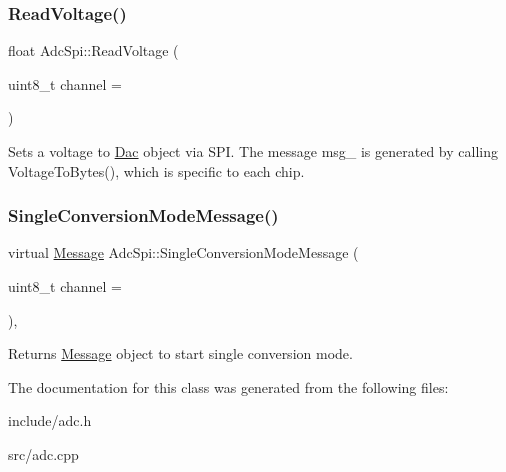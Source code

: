 \subsubsection{\texorpdfstring{Read\+Voltage()}{ReadVoltage()}}
{\footnotesize\ttfamily float Adc\+Spi\+::\+Read\+Voltage (\begin{DoxyParamCaption}\item[{uint8\+\_\+t}]{channel = {} }\end{DoxyParamCaption})}

Sets a voltage to \mbox{\hyperlink{classDac}{Dac}} object via S\+PI. The message msg\+\_\+ is generated by calling Voltage\+To\+Bytes(), which is specific to each chip. \mbox{\label{classAdcSpi_ac6a6421e3045c986c6997019a04d11ea}} 
\subsubsection{\texorpdfstring{Single\+Conversion\+Mode\+Message()}{SingleConversionModeMessage()}}
{\footnotesize\ttfamily virtual \mbox{\hyperlink{structAdcSpi_1_1Message}{Message}} Adc\+Spi\+::\+Single\+Conversion\+Mode\+Message (\begin{DoxyParamCaption}\item[{uint8\+\_\+t}]{channel = {} }\end{DoxyParamCaption})\hspace{0.3cm}{\ttfamily [protected]}, {}}

Returns \mbox{\hyperlink{structAdcSpi_1_1Message}{Message}} object to start single conversion mode. 

The documentation for this class was generated from the following files\+:\begin{DoxyCompactItemize}
\item 
include/adc.\+h\item 
src/adc.\+cpp\end{DoxyCompactItemize}
